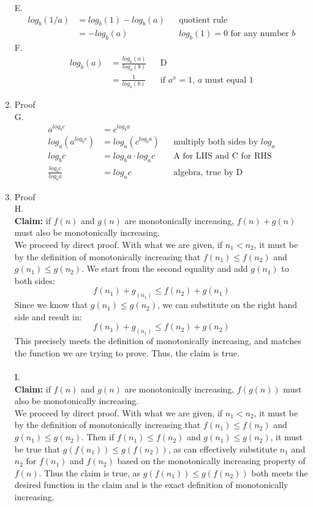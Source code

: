 \documentclass{article}
\begin{document}
\begin{enumerate}
	E.
	\begin{align}
		log_b(1/a) &= log_b(1)-log_b(a)&& \text{quotient rule} \\
		&=-log_b(a)  && log_b(1)=0\text{ for any number $b$}  
	\end{align}
	F.
	\begin{align}
		log_b(a)&= \frac{log_a(a)}{log_a(b)} && \text{D} \\
		&= \frac{1}{log_a(b)} && \text{if $a^x=1$, $a$ must equal 1} 
	\end{align}
	\item Proof \\
	G.
	\begin{align*}
		a^{log_bc}&= c^{log_ba} \\
		log_a(a^{log_bc})&= log_a(c^{log_ba}) && \text{multiply both sides by $log_a$} \\
		log_bc &= log_ba \cdot log_ac && \text{A for LHS and C for RHS} \\
		\frac{log_bc}{log_ba} &= log_ac && \text{algebra, true by D} 
	\end{align*}
	\item Proof \\
	H. \\
	\textbf{Claim:} if $f(n)$ and $g(n)$ are monotonically increasing, $f(n)+g(n)$ must also be monotonically increasing.
	\\ We proceed by direct proof. With what we are given, if $n_1<n_2$, it must be by the definition of monotonically increasing that $f(n_1)\leq f(n_2)$ and $g(n_1)\leq g(n_2)$. We start from the second equality and add $g(n_1)$ to both sides:
	$$f(n_1)+g_(n_1)\leq f(n_2)+g(n_1)$$
Since we know that $g(n_1)\leq g(n_2)$, we can substitute on the right hand side and result in:
	$$f(n_1)+g_(n_1)\leq f(n_2)+g(n_2)$$
This precisely meets the definition of monotonically increasing, and matches the function we are trying to prove. Thus, the claim is true.\\\\
	I. \\
	\textbf{Claim:} if $f(n)$ and $g(n)$ are monotonically increasing, $f(g(n))$ must also be monotonically increasing.
	\\ We proceed by direct proof. With what we are given, if $n_1<n_2$, it must be by the definition of monotonically increasing that $f(n_1)\leq f(n_2)$ and $g(n_1)\leq g(n_2)$.  Then if $f(n_1)\leq f(n_2)$ and $g(n_1)\leq g(n_2)$, it must be true that $g(f(n_1))\leq g(f(n_2))$, as can effectively substitute $n_1$ and $n_2$ for $f(n_1)$ and $f(n_2)$ based on the monotonically increasing property of $f(n)$. Thus the claim is true, as $g(f(n_1))\leq g(f(n_2))$ both meets the desired function in the claim and is the exact definition of monotonically increasing.\\\\

\end{enumerate}
\end{document}
